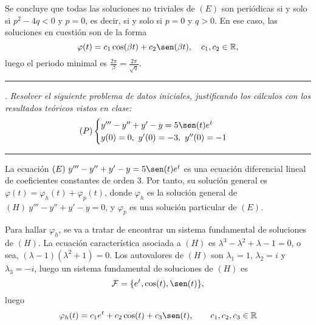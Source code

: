 \documentclass[11pt]{report}
\newcommand{\R}{\mathbb R}
\begin{document}
\begin{itemize}
\vspace{2mm}

Se concluye que todas las soluciones no triviales de $(E)$ son periódicas si y solo si $p^2-4q<0$ y $p=0$, es decir, si y solo si $p=0$ y $q>0$. En ese caso, las soluciones en cuestión son de la forma
\[\varphi(t)=c_1\cos(\beta t)+c_2\sen(\beta t), \quad c_1,c_2 \in \R,\]
luego el periodo minimal es $\frac{2\pi}{\beta}=\frac{2\pi}{\sqrt{q}}$.

\end{itemize}

\vspace{2mm}

\hrule

\vspace{4mm}

. \textit{Resolver el siguiente problema de datos iniciales, justificando los cálculos con los resultados teóricos vistos en clase:}
\[(P) \begin{cases}
    y'''-y''+y'-y=5\sen(t)e^t \\
    y(0)=0, \ y'(0)=-3, \ y''(0)=-1
\end{cases}\]

\vspace{2mm}

\hrule

\vspace{4mm}

La ecuación $(E) \ y'''-y''+y'-y=5\sen(t)e^t$ es una ecuación diferencial lineal de coeficientes constantes de orden $3$. Por tanto, su solución general es $\varphi(t)=\varphi_h(t)+\varphi_p(t)$, donde $\varphi_h$ es la solución general de $(H) \ y'''-y''+y'-y=0$, y $\varphi_p$ es una solución particular de $(E)$.

\vspace{2mm}

Para hallar $\varphi_h$, se va a tratar de encontrar un sistema fundamental de soluciones de $(H)$. La ecuación característica asociada a $(H)$ es $\lambda^3-\lambda^2+\lambda-1=0$, o sea, $(\lambda-1)(\lambda^2+1)=0$. Los autovalores de $(H)$ son $\lambda_1=1$, $\lambda_2=i$ y $\lambda_3=-i$, luego un sistema fundamental de soluciones de $(H)$ es
\[\mathcal{F}=\{e^t,\cos(t),\sen(t)\},\]
luego
\[\varphi_h(t)=c_1e^t+c_2\cos(t)+c_3\sen(t), \qquad c_1,c_2,c_3 \in \R\]
\end{document}
